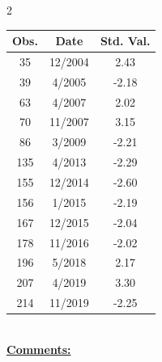 
\bigskip 
\begin{multicols}{2}{ 
\begin{tabular}{ccc}
\hline  Obs.  &  Date &  Std. Val. \\ 
\hline 
                       35 &       12/2004 &          2.43 \vspace{-.12in} \\  
                       39 &        4/2005 &         -2.18 \vspace{-.12in} \\  
                       63 &        4/2007 &          2.02 \vspace{-.12in} \\  
                       70 &       11/2007 &          3.15 \vspace{-.12in} \\  
                       86 &        3/2009 &         -2.21 \vspace{-.12in} \\  
                      135 &        4/2013 &         -2.29 \vspace{-.12in} \\  
                      155 &       12/2014 &         -2.60 \vspace{-.12in} \\  
                      156 &        1/2015 &         -2.19 \vspace{-.12in} \\  
                      167 &       12/2015 &         -2.04 \vspace{-.12in} \\  
                      178 &       11/2016 &         -2.02 \vspace{-.12in} \\  
                      196 &        5/2018 &          2.17 \vspace{-.12in} \\  
                      207 &        4/2019 &          3.30 \vspace{-.12in} \\  
                      214 &       11/2019 &         -2.25 \vspace{-.12in} \\  
 \end{tabular} 
\\ 
 \columnbreak 
 \singlespacing 
 \underline{\textbf{Comments:}} \\ 
 \bigskip       

 } 
\end{multicols} 

